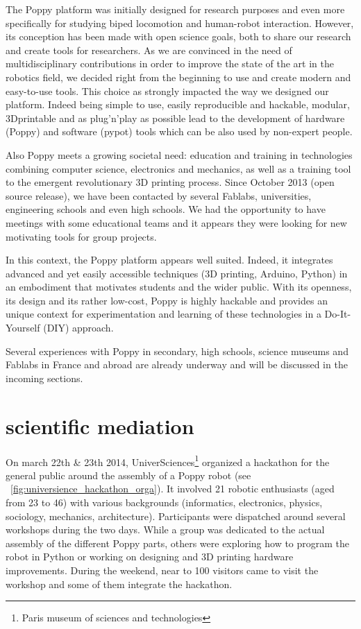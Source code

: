 The Poppy platform was initially designed for research purposes and even more specifically for studying biped locomotion and human-robot interaction. However, its conception has been made with open science goals, both to share our research and create tools for researchers. As we are convinced in the need of multidisciplinary contributions in order to improve the state of the art in the robotics field, we decided right from the beginning to use and create modern and easy-to-use tools. This choice as strongly impacted the way we designed our platform. Indeed being simple to use, easily reproducible and hackable, modular, 3Dprintable and as plug'n'play as possible lead to the development of hardware (Poppy) and software (pypot) tools which can be also used by non-expert people.

Also Poppy meets a growing societal need: education and training in technologies combining computer science, electronics and mechanics, as well as a training tool to the emergent revolutionary 3D printing process. Since October 2013 (open source release), we have been contacted by several Fablabs, universities, engineering schools and even high schools. We had the opportunity to have meetings with some educational teams and it appears they were looking for new motivating tools for group projects.

In this context, the Poppy platform appears well suited. Indeed, it integrates advanced and yet easily accessible techniques (3D printing, Arduino, Python) in an embodiment that motivates students and the wider public. With its openness, its design and its rather low-cost, Poppy is highly hackable and provides an unique context for experimentation and learning of these technologies in a Do-It-Yourself (DIY) approach.

Several experiences with Poppy in secondary, high schools, science museums and Fablabs in France and abroad are already underway and will be discussed in the incoming sections.


\section{scientific mediation} %

On march 22th \& 23th 2014, UniverSciences\footnote{Paris museum of sciences and technologies} organized a hackathon for the general public around the assembly of a Poppy robot (see \figurename~\ref{fig:universience_hackathon_orga}). It involved 21 robotic enthusiasts (aged from 23 to 46) with various backgrounds (informatics, electronics, physics, sociology, mechanics, architecture).
Participants were dispatched around several workshops during the two days. While a group was dedicated to the actual assembly of the different Poppy parts, others were exploring how to program the robot in Python or working on designing and 3D printing hardware improvements.
During the weekend, near to 100 visitors came to visit the workshop and some of them integrate the hackathon.


